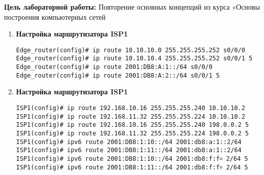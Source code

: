 \documentclass[a4paper,14pt]{extarticle}
\begin{document}
    \textbf{Цель лабораторной работы:}
    Повторение основных концепций из курса «Основы построения компьютерных сетей
    

    \begin{enumerate}
        \item \textbf{Настройка маршрутизатора ISP1}
        \begin{lstlisting}
Edge_router(config)# ip route 10.10.10.0 255.255.255.252 s0/0/0
Edge_router(config)# ip route 10.10.10.4 255.255.255.252 s0/0/1 5
Edge_router(config)# ip route 2001:DB8:A:1::/64 s0/0/0
Edge_router(config)# ip route 2001:DB8:A:2::/64 s0/0/1 5
        \end{lstlisting}
        \item \textbf{Настройка маршрутизатора ISP1}
        \begin{lstlisting}
ISP1(config)# ip route 192.168.10.16 255.255.255.240 10.10.10.2
ISP1(config)# ip route 192.168.11.32 255.255.255.224 10.10.10.2
ISP1(config)# ip route 192.168.10.16 255.255.255.240 198.0.0.2 5
ISP1(config)# ip route 192.168.11.32 255.255.255.224 198.0.0.2 5
ISP1(config)# ipv6 route 2001:DB8:1:10::/64 2001:db8:a:1::2/64
ISP1(config)# ipv6 route 2001:DB8:1:11::/64 2001:db8:a:1::2/64
ISP1(config)# ipv6 route 2001:DB8:1:10::/64 2001:db8:f:f። 2/64 5
ISP1(config)# ipv6 route 2001:DB8:1:11::/64 2001:db8:f:f። 2/64 5
        \end{lstlisting}
    \end{enumerate}
\end{document}
